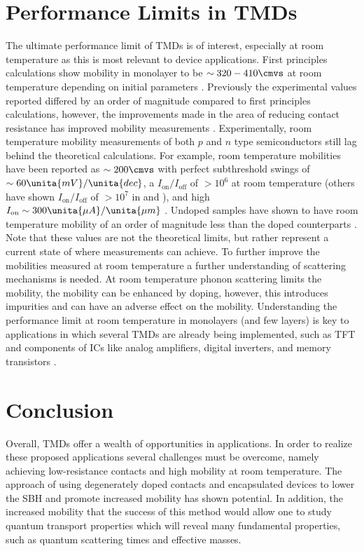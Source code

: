 \section{Performance Limits in \acp{TMD}}\label{sec:performance_limits}
The ultimate performance limit of \acp{TMD} is of interest, especially at room temperature as this is most relevant to device applications. 
First principles calculations show mobility in monolayer  to be $\sim 320-410\cmvs$ at room temperature depending on initial parameters \cite{Li_PhysRevB2013,Kaasbjerg_PhysRevB2012}. Previously the experimental values reported differed by an order of magnitude compared to first principles calculations, however, the improvements made in the area of reducing contact resistance has improved mobility measurements \cite{Radisavljevic_NatureNano2011,Kappera_APLmat2014}. Experimentally, room temperature mobility measurements of both $p$ and $n$ type semiconductors still lag behind the theoretical calculations. For example,  room temperature mobilities have been reported as $\sim 200\cmvs$ with perfect subthreshold swings of $\sim 60\unita{mV}/\unita{dec}$, a $I_\mathrm{on}/I_\mathrm{off}$ of $> 10^6$ at room temperature (others have shown $I_\mathrm{on}/I_\mathrm{off}$ of $> 10^7$ in  and ), and high $I_\mathrm{on} \sim 300\unita{\mu A}/\unita{\mu m}$ \cite{Fang_NanoLett2012,Liu_NanoLett2013,Kappera_NatureMat2014,Das_NanoLett2014}. Undoped samples have shown to have room temperature mobility of an order of magnitude less than the doped counterparts \cite{Li_NanoLett2013,Das_NanoLett2014}. Note that these values are not the theoretical limits, but rather represent a current state of where measurements can achieve. To further improve the mobilities measured at room temperature a further understanding of scattering mechanisms is needed. At room temperature phonon scattering limits the mobility, the mobility can be enhanced by doping, however, this introduces impurities and can have an adverse effect on the mobility. Understanding the performance limit at room temperature in monolayers (and few layers) is key to applications in which several \acp{TMD} are already being implemented, such as \ac{TFT} and components of \acp{IC} like analog amplifiers, digital inverters, and memory transistors \cite{Bhimanapati_ACSnano2015,Akinwande_NatureComm2014,Lee_Small2012}.

\section{Conclusion}\label{sec:conclusion}
Overall, \acp{TMD} offer a wealth of opportunities in applications. In order to realize these proposed applications several challenges must be overcome, namely achieving low-resistance contacts and high mobility at room temperature. The approach of using degenerately doped contacts and \hbn encapsulated devices to lower the \acs{SBH} and promote increased mobility has shown potential. In addition, the increased mobility that the success of this method would allow one to study quantum transport properties which will reveal many fundamental properties, such as quantum scattering times and effective masses. 